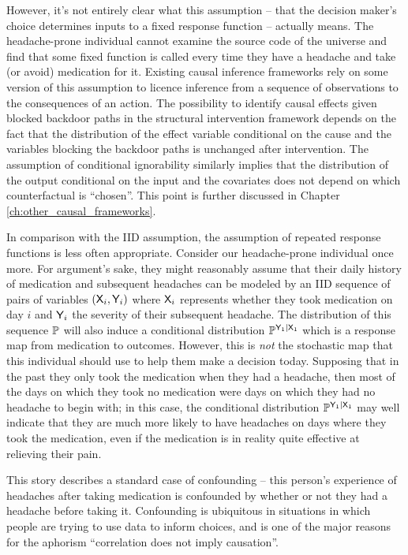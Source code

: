 However, it's not entirely clear what this assumption -- that the decision maker's choice determines inputs to a fixed response function -- actually means. The headache-prone individual cannot examine the source code of the universe and find that some fixed function is called every time they have a headache and take (or avoid) medication for it. Existing causal inference frameworks rely on some version of this assumption to licence inference from a sequence of observations to the consequences of an action. The possibility to identify causal effects given blocked backdoor paths in the structural intervention framework \citep[Ch. ~1]{pearl_causality:_2009} depends on the fact that the distribution of the effect variable conditional on the cause and the variables blocking the backdoor paths is unchanged after intervention. The assumption of conditional ignorability \citep{rubin_causal_2005} similarly implies that the distribution of the output conditional on the input and the covariates does not depend on which counterfactual is ``chosen''. This point is further discussed in Chapter \ref{ch:other_causal_frameworks}.

In comparison with the IID assumption, the assumption of repeated response functions is less often appropriate. Consider our headache-prone individual once more. For argument's sake, they might reasonably assume that their daily history of medication and subsequent headaches can be modeled by an IID sequence of pairs of variables $(\mathsf{X}_i,\mathsf{Y}_i)$ where $\mathsf{X}_i$ represents whether they took medication on day $i$ and $\mathsf{Y}_i$ the severity of their subsequent headache. The distribution of this sequence $\mathbb{P}$ will also induce a conditional distribution $\mathbb{P}^{\mathsf{Y}_1|\mathsf{X}_1}$ which is a response map from medication to outcomes. However, this is \emph{not} the stochastic map that this individual should use to help them make a decision today. Supposing that in the past they only took the medication when they had a headache, then most of the days on which they took no medication were days on which they had no headache to begin with; in this case, the conditional distribution $\mathbb{P}^{\mathsf{Y}_1|\mathsf{X}_1}$ may well indicate that they are much more likely to have headaches on days where they took the medication, even if the medication is in reality quite effective at relieving their pain.

This story describes a standard case of confounding -- this person's experience of headaches after taking medication is confounded by whether or not they had a headache before taking it. Confounding is ubiquitous in situations in which people are trying to use data to inform choices, and is one of the major reasons for the aphorism ``correlation does not imply causation''.

